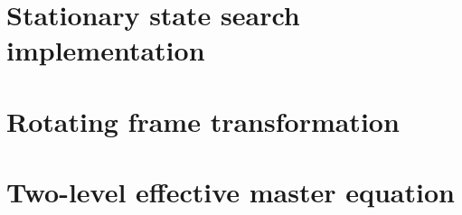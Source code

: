 \documentclass[a4paper,oneside,12pt]{hwthesis}
\newcommand*{\chappath}{../../include/chapters}
\newcommand*{\refpath}{../../include/refs}
\begin{document}
\appendix
\chapter{\label{chp:mpostat}Stationary state search implementation}



\chapter{\label{chp:rotframe}Rotating frame transformation}



\chapter{\label{chp:adelim}Two-level effective master equation}





\end{document}
